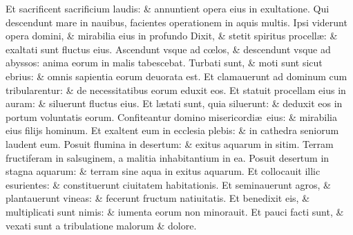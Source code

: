 \documentclass[a5paper,10pt]{book}
\def\ae{æ}
\def\oe{œ}
\begin{document}
\begin{multicols*}{2}
\newline \color{red} E\color{black}t sacrificent sacrificium laudis: \& annuntient opera eius in exultatione.
\newline \color{red} Q\color{black}ui descendunt mare in nauibus, facientes operationem in aquis multis.
\newline \color{red} I\color{black}psi viderunt opera domini, \& mirabilia eius in profundo
\newline \color{red} D\color{black}ixit, \& stetit spiritus procell\ae : \& exaltati sunt fluctus eius.
\newline \color{red} A\color{black}scendunt vsque ad c\oe los, \& descendunt vsque ad abyssos: anima eorum in malis tabescebat.
\newline \color{red} T\color{black}urbati sunt, \& moti sunt sicut ebrius: \& omnis sapientia eorum deuorata est.
\newline \color{red} E\color{black}t clamauerunt ad dominum cum tribularentur: \& de necessitatibus eorum eduxit eos.
\newline \color{red} E\color{black}t statuit procellam eius in auram: \& siluerunt fluctus eius.
\newline \color{red} E\color{black}t l\ae tati sunt, quia siluerunt: \& deduxit eos in portum voluntatis eorum.
\newline \color{red} C\color{black}onfiteantur domino misericordi\ae \ eius: \& mirabilia eius filijs hominum.
\newline \color{red} E\color{black}t exaltent eum in ecclesia plebis: \& in cathedra seniorum laudent eum.
\newline \color{red} P\color{black}osuit flumina in desertum: \& exitus aquarum in sitim.
\newline \color{red} T\color{black}erram fructiferam in salsuginem, a malitia inhabitantium in ea.
\newline \color{red} P\color{black}osuit desertum in stagna aquarum: \& terram sine aqua in exitus aquarum.
\newline \color{red} E\color{black}t collocauit illic esurientes: \& constituerunt ciuitatem habitationis.
\newline \color{red} E\color{black}t seminauerunt agros, \& plantauerunt vineas: \& fecerunt fructum natiuitatis.
\newline \color{red} E\color{black}t benedixit eis, \& multiplicati sunt nimis: \& iumenta eorum non minorauit.
\newline \color{red} E\color{black}t pauci facti sunt, \& vexati sunt a tribulatione malorum \& dolore.

\end{multicols*}
\end{document}
